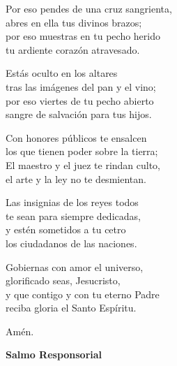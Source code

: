 \documentclass[12pt, letterpaper]{report}
\begin{document}
    \noindent
    Por eso pendes de una cruz sangrienta,\\
    abres en ella tus divinos brazos;\\
    por eso muestras en tu pecho herido\\
    tu ardiente coraz\'on atravesado.

    \noindent
    Est\'as oculto en los altares\\
    tras las im\'agenes del pan y el vino;\\
    por eso viertes de tu pecho abierto\\
    sangre de salvaci\'on para tus hijos.

    \noindent
    Con honores p\'ublicos te ensalcen\\
    los que tienen poder sobre la tierra;\\
    El maestro y el juez te rindan  culto,\\
    el arte y la ley no te desmientan.

    \noindent
    Las insignias de los reyes todos\\
    te sean para siempre dedicadas,\\
    y est\'en sometidos a tu cetro\\
    los ciudadanos de las naciones.

    \noindent
    Gobiernas con amor el universo,\\
    glorificado seas, Jesucristo,\\
    y que contigo y con tu eterno Padre\\
    reciba gloria el Santo Esp\'iritu.

    \noindent
    Am\'en.
    \clearpage



    
    \begin{center}
        \Huge {\bfseries Salmo Responsorial}
    \end{center}
\end{document}
